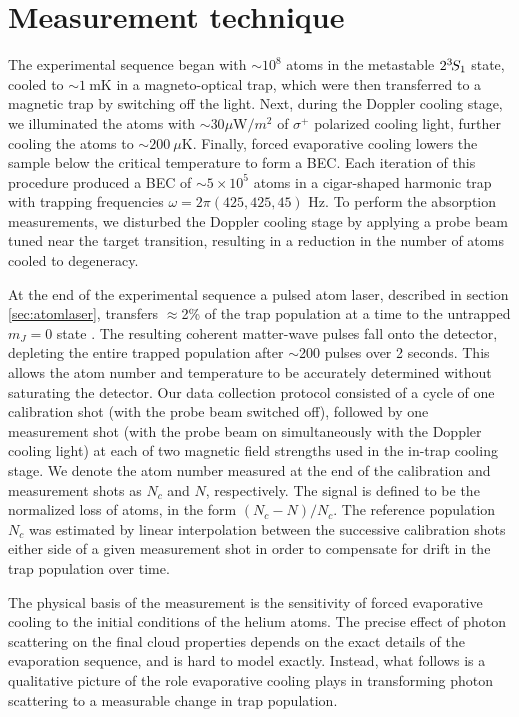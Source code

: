 \section{Measurement technique}

	The experimental sequence began with $\sim10^8$ atoms in the metastable $2^{3\!} S_1$ state, cooled to  $\sim1~\textrm{mK}$ in a magneto-optical trap, which were then transferred to a magnetic trap by switching off the light.
	Next, during the Doppler cooling stage, we illuminated the atoms with $\sim$30$\mu$W$/m^2$ of $\sigma^+$ polarized cooling light, further cooling the atoms to $\sim200~\mu \textrm{K}$.
	Finally, forced evaporative cooling lowers the sample below the critical temperature to form a BEC.
	Each iteration of this procedure produced a BEC of $\sim 5\times10^5$ atoms in a cigar-shaped harmonic trap with trapping frequencies $\omega = 2\pi (425,425,45)$ Hz.
	To perform the absorption measurements, we disturbed the Doppler cooling stage by applying a probe beam tuned near the target transition, resulting in a reduction in the number of atoms cooled to degeneracy. 
	

	At the end of the experimental sequence a pulsed atom laser, described in section \ref{sec:atomlaser}, transfers $\approx$2\% of the trap population at a time to the untrapped $m_J=0$ state \cite{Manning10,Henson18_BCR}.
	The resulting coherent matter-wave pulses fall onto the detector, {depleting the entire trapped population after $\sim$200 pulses over 2 seconds.
	This allows}  the atom number and temperature to be accurately determined without saturating the detector.
	Our data collection protocol consisted of a cycle of one calibration shot (with the probe beam switched off), followed by one measurement shot (with the probe beam on simultaneously with the Doppler cooling light) at each of two magnetic field strengths used in the in-trap cooling stage.
	We denote the atom number measured at the end of the calibration and measurement shots as $N_c$ and $N$, respectively.
	The signal is defined to be the normalized loss of atoms, in the form $(N_c-N)/N_c$.
	The reference population $N_c$ was estimated by linear interpolation between the successive calibration shots either side of a given measurement shot in order to compensate for drift in the trap population over time.
	
	The physical basis of the measurement is the sensitivity of forced evaporative cooling to the initial conditions of the helium atoms.
	The precise effect of photon scattering on the final cloud properties depends on the exact details of the evaporation sequence, and is hard to model exactly.
	Instead, what follows is a qualitative picture of the role evaporative cooling plays in transforming photon scattering to a measurable change in trap population.

